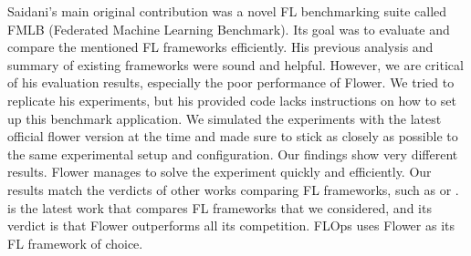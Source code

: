 Saidani's main original contribution was a novel FL benchmarking suite called FMLB (Federated Machine Learning Benchmark).
Its goal was to evaluate and compare the mentioned FL frameworks efficiently.
His previous analysis and summary of existing frameworks were sound and helpful.
However, we are critical of his evaluation results, especially the poor performance of Flower.
We tried to replicate his experiments, but his provided code \cite{tum_fl_framework_thesis_github} lacks instructions on how to set up this benchmark application.
We simulated the experiments with the latest official flower version at the time and made sure to stick as closely as possible to the same experimental setup and configuration.
Our findings show very different results.
Flower manages to solve the experiment quickly and efficiently.
Our results match the verdicts of other works comparing FL frameworks, such as \cite{comparative_analysis_of_fl_frameworks} or \cite{comprehensive_study_fl_frameworks_degree_project}.
\cite{comparative_analysis_of_fl_frameworks} is the latest work that compares FL frameworks that we considered, and its verdict is that Flower outperforms all its competition.
FLOps uses Flower as its FL framework of choice.